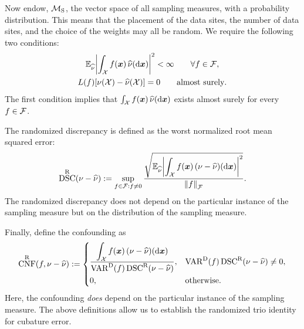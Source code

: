 \documentclass[graybox,footinfo]{svmult}
\DeclareMathOperator{\algn}{CNF}
\DeclareMathOperator{\disc}{DSC}
\DeclareMathOperator{\Var}{VAR}
\begin{document}
Now endow, ${\mathcal{M}}_{\textup{S}}$, the vector space of all sampling measures, with a 
probability distribution.  This means that the placement of the data sites, the number of 
data sites, and the choice of the weights may all be random.  We require  
the following two conditions:
\begin{subequations} \label{FJH:eq:randMcond}
\begin{gather}
\bbE_{\hnu} \biggabs{\int_{\calX} f(\bsx) \,  \hnu(\D \bsx)}^2 < \infty \qquad \forall f \in 
\calF, 
\\
\label{FJH:eq:randMcondB}
L(f) [\nu(\calX) - \hnu(\calX)] = 0  \qquad \text{almost surely}.
\end{gather}
\end{subequations}
The first condition implies that $\int_{{\mathcal{X}}} f({\boldsymbol{x}}) \,  \widehat{\nu}(\mathrm{d} {\boldsymbol{x}})$ exists 
almost surely for every $f \in {\mathcal{F}}$.  

The randomized discrepancy is  defined as the worst  normalized root mean squared 
error:
\begin{equation} \label{FJH:eq:rnddiscdef}
\disc^\Rn(\nu - \hnu) : =\sup_{f \in \calF : f \ne 0} \frac{\displaystyle \sqrt{\bbE_{\hnu}
\biggabs{\int_{\calX} 
		f(\bsx) \, (\nu - \hnu)(\D \bsx)}^2}}{\norm{f}_{\calF}}.
\end{equation}
The randomized discrepancy does not depend on the particular instance of the 
sampling measure but on the distribution of the sampling measure. 

Finally, define the confounding as 
\begin{equation} \label{FJH:eq:rndconfdef}
\algn^\Rn(f,\nu - \hnu): =  \begin{cases} \displaystyle 
\frac{\displaystyle\int_{\calX} f(\bsx) \, (\nu - \hnu)(\D 
	\bsx)}{\Var^\Dt(f)\disc^\Rn(\nu - \hnu)},  & 
\Var^\Dt(f)\disc^\Rn(\nu - \hnu) \ne 0, \\[2ex]
0, & \text{otherwise}.
\end{cases}
\end{equation}
Here, the confounding \emph{does} depend on the particular instance of the sampling 
measure.  The above definitions allow us to establish the randomized trio identity for 
cubature 
error.
\end{document}
